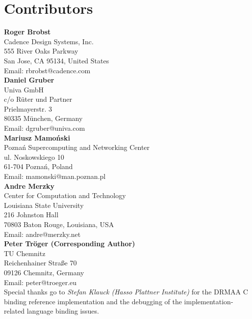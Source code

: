 \documentclass{article}
\begin{document}
\newpage

\section{Contributors}

\textbf{Roger Brobst}\\
Cadence Design Systems, Inc.\\
555 River Oaks Parkway \\
San Jose, CA 95134, United States\\
Email: rbrobst@cadence.com\\

\textbf{Daniel Gruber}\\
Univa GmbH\\
c/o Rüter und Partner\\
Prielmayerstr. 3\\
80335 München, Germany\\
Email: dgruber@univa.com\\

\textbf{Mariusz Mamoński}\\
Poznań Supercomputing and Networking Center\\
ul. Noskowskiego 10\\
61-704 Poznań, Poland\\
Email: mamonski@man.poznan.pl\\

\textbf{Andre Merzky}\\
Center for Computation and Technology\\
Louisiana State University\\
216 Johnston Hall\\
70803 Baton Rouge,  Louisiana, USA\\
Email:  andre@merzky.net\\

\textbf{Peter Tröger (Corresponding Author)} \\
TU Chemnitz\\
Reichenhainer Straße 70\\
09126 Chemnitz, Germany\\
Email: peter@troeger.eu \\

Special thanks go to \emph{Stefan Klauck (Hasso Plattner Institute)} for the DRMAA C binding reference implementation and the  debugging of the implementation-related language binding issues.

\end{document}
